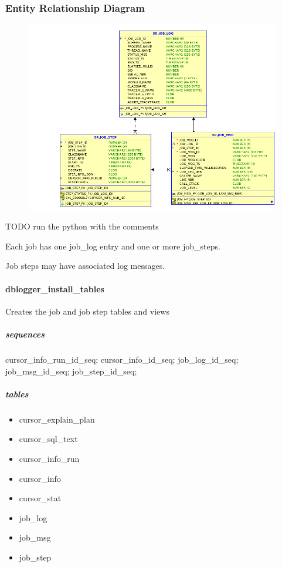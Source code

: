 \documentclass[letterpaper,10pt,english]{sphinxmanual}
\begin{document}
\subsubsection{Entity Relationship Diagram}
\label{databaseLogging:entity-relationship-diagram}\begin{figure}[htbp]
\centering

\includegraphics{job_tables_erd.png}
\end{figure}

TODO run the python with the comments

Each job has one job\_log entry and one or more job\_steps.

Job steps may have associated log messages.


\paragraph{dblogger\_install\_tables}
\label{databaseLogging:dblogger-install-tables}
Creates the job and job step tables and views


\subparagraph{sequences}
\label{databaseLogging:sequences}
cursor\_info\_run\_id\_seq; cursor\_info\_id\_seq; job\_log\_id\_seq;
job\_msg\_id\_seq; job\_step\_id\_seq;


\subparagraph{tables}
\label{databaseLogging:tables}\begin{itemize}
\item {} 
cursor\_explain\_plan

\item {} 
cursor\_sql\_text

\item {} 
cursor\_info\_run

\item {} 
cursor\_info

\item {} 
cursor\_stat

\item {} 
job\_log

\item {} 
job\_msg

\item {} 
job\_step

\end{itemize}
\end{document}
